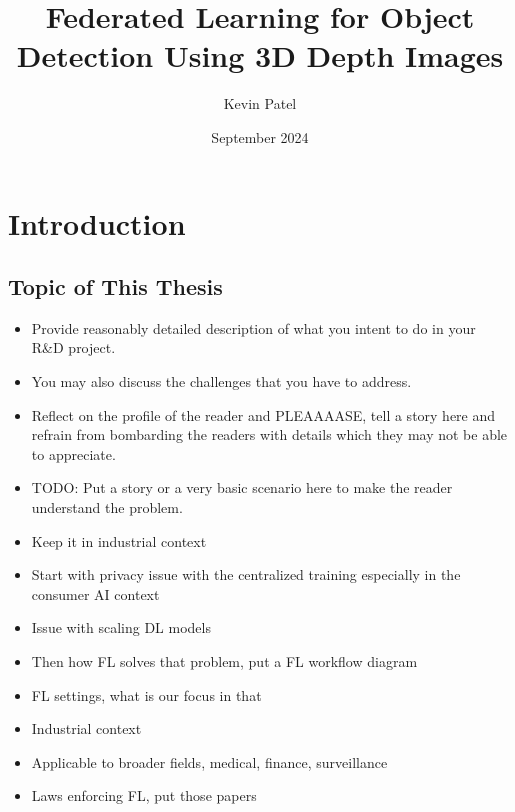 \documentclass[thesis]{mas_proposal}
\title{Federated Learning for Object Detection Using 3D Depth Images}
\author{Kevin Patel}
\date{September 2024}
\begin{document}
\maketitle

\pagestyle{plain}

\section{Introduction}

\subsection{Topic of This Thesis}
\begin{itemize}
      \item Provide reasonably detailed description of what you intent to do in your R\&D project.
      \item You may also discuss the challenges that you have to address.
      \item Reflect on the profile of the reader and PLEAAAASE, tell a story here and refrain from bombarding the readers with details which they may not be able to appreciate.

      \item TODO: Put a story or a very basic scenario here to make the reader understand the problem.
      \item Keep it in industrial context
      \item Start with privacy issue with the centralized training especially in the consumer AI context
      \item Issue with scaling DL models
      \item Then how FL solves that problem, put a FL workflow diagram
      \item FL settings, what is our focus in that
      \item Industrial context
      \item Applicable to broader fields, medical, finance, surveillance
      \item Laws enforcing FL, put those papers


\end{itemize}
\end{document}
